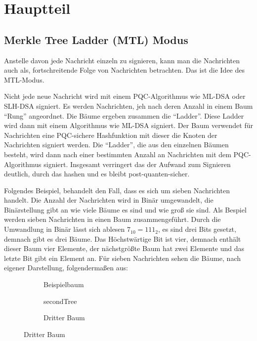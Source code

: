\chapter{Hauptteil}

\section{Merkle Tree Ladder (MTL) Modus}
Anstelle davon jede Nachricht einzeln zu signieren, kann man die Nachrichten auch als, fortschreitende Folge von Nachrichten betrachten.
Das ist die Idee des MTL-Modus.

Nicht jede neue Nachricht wird mit einem PQC-Algorithmus wie ML-DSA oder SLH-DSA signiert.
Es werden Nachrichten, jeh nach deren Anzahl in einem Baum \enquote{Rung} angeordnet. Die Bäume ergeben zusammen die \enquote{Ladder}. Diese Ladder wird dann mit einem Algorithmus wie ML-DSA signiert.
Der Baum verwendet für Nachrichten eine PQC-sichere Hashfunktion mit dieser die Knoten der Nachrichten signiert werden.\cite{freglyMerkleTreeLadder2023}
Die \enquote{Ladder}, die aus den einzelnen Bäumen besteht, wird dann nach einer bestimmten Anzahl an Nachrichten mit dem PQC-Algorithmus signiert.
Insgesamt verringert das der Aufwand zum Signieren deutlich, durch das hashen und es bleibt post-quanten-sicher.

Folgendes Beispiel, behandelt den Fall, dass es sich um sieben Nachrichten handelt.
Die Anzahl der Nachrichten wird in Binär umgewandelt, die Binärstellung gibt an wie viele Bäume es sind und wie groß sie sind.
Als Bespiel werden sieben Nachrichten in einen Baum zusammengeführt. Durch die Umwandlung in Binär lässt sich ablesen $7_{10} = 111_{2}$, es sind drei Bits gesetzt,
demnach gibt es drei Bäume. Das Höchstwärtige Bit ist vier, demnach enthält dieser Baum vier Elemente, der nächstgrößte Baum hat zwei Elemente und das letzte Bit gibt ein Element an.
Für sieben Nachrichten sehen die Bäume, nach eigener Darstellung, folgendermaßen aus:

\begin{figure}[htbp]
    \begin{subfigure}[b]{0.3\textwidth}
        \centering
        \siebenErsterBaum
        \caption{Beispielbaum}
    \label{fig:baum}
    \end{subfigure}
    \hfill
    \begin{subfigure}[b]{0.3\textwidth}
        \centering
        \siebenZweiterBaum
        \caption{secondTree}
        \label{fig:secondBaum}
    \end{subfigure}
    \hfill
    \begin{subfigure}[b]{0.3\textwidth}
        \centering
        \siebenDritterBaum
        \caption{Dritter Baum}
        \label{thirdTree}
    \end{subfigure}
\end{figure}

